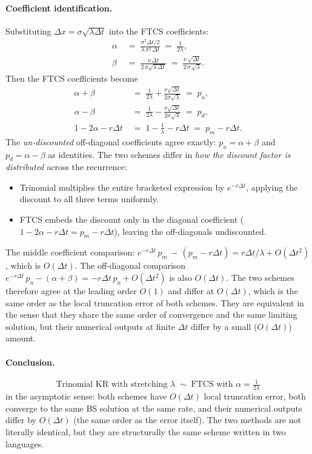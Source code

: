\documentclass[11pt,a4paper]{article}
\begin{document}
\paragraph{Coefficient identification.} Substituting
$\Delta x = \sigma\sqrt{\lambda\Delta t}$ into the FTCS coefficients:
\begin{align*}
\alpha \;&=\; \frac{\sigma^2 \Delta t/2}{\lambda\,\sigma^2\,\Delta t} \;=\; \frac{1}{2\lambda},\\
\beta  \;&=\; \frac{\nu\,\Delta t}{2\,\sigma\sqrt{\lambda\,\Delta t}} \;=\; \frac{\nu\,\sqrt{\Delta t}}{2\,\sigma\,\sqrt{\lambda}}.
\end{align*}
Then the FTCS coefficients become
\begin{align*}
\alpha + \beta \;&=\; \frac{1}{2\lambda} + \frac{\nu\sqrt{\Delta t}}{2\sigma\sqrt{\lambda}} \;=\; p_u,\\
\alpha - \beta \;&=\; \frac{1}{2\lambda} - \frac{\nu\sqrt{\Delta t}}{2\sigma\sqrt{\lambda}} \;=\; p_d,\\
1 - 2\alpha - r\Delta t \;&=\; 1 - \frac{1}{\lambda} - r\Delta t \;=\; p_m - r\Delta t.
\end{align*}
The \emph{un-discounted} off-diagonal coefficients agree exactly:
$p_u = \alpha + \beta$ and $p_d = \alpha - \beta$ as identities.
The two schemes differ in \emph{how the discount factor is
distributed} across the recurrence:
\begin{itemize}[leftmargin=2em]
\item Trinomial multiplies the entire bracketed expression by
$e^{-r\Delta t}$, applying the discount to all three terms uniformly.
\item FTCS embeds the discount only in the diagonal coefficient
($1 - 2\alpha - r\Delta t = p_m - r\Delta t$), leaving the
off-diagonals undiscounted.
\end{itemize}
The middle coefficient comparison:
$e^{-r\Delta t}\,p_m \,-\, (p_m - r\Delta t) = r\Delta t / \lambda + O(\Delta t^2)$,
which is $O(\Delta t)$. The off-diagonal comparison
$e^{-r\Delta t}\,p_u - (\alpha + \beta) = -r\Delta t\,p_u + O(\Delta t^2)$
is also $O(\Delta t)$. The two schemes therefore agree at the leading
order $O(1)$ and differ at $O(\Delta t)$, which is the same order
as the local truncation error of both schemes. They are equivalent
in the sense that they share the same order of convergence and the
same limiting solution, but their numerical outputs at finite
$\Delta t$ differ by a small ($O(\Delta t)$) amount.

\paragraph{Conclusion.}
\begin{equation}
\boxed{\;\;\text{Trinomial KR with stretching } \lambda \;\sim\; \text{FTCS with } \alpha = \tfrac{1}{2\lambda} \;\;}
\label{eq:equivalence}
\end{equation}
in the asymptotic sense: both schemes have $O(\Delta t)$ local
truncation error, both converge to the same BS solution at the same
rate, and their numerical outputs differ by $O(\Delta t)$ (the same
order as the error itself). The two methods are not literally
identical, but they are structurally the same scheme written in two
languages.
\end{document}
